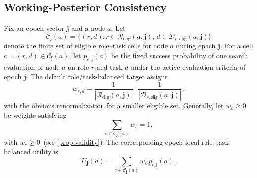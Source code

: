 \subsection{Working-Posterior Consistency}
\label{app:proofs:role_task_balance}
Fix an epoch vector \(\boldsymbol{j}\) and a node \(a\). Let
\[
\mathcal C_{\boldsymbol{j}}(a)
=
\{(r,d): r\in \mathcal{R}_{\mathrm{elig}}(a,\boldsymbol{j}),\ d\in \mathcal{D}_{r,\mathrm{elig}}(a,\boldsymbol{j})\}
\]
denote the finite set of eligible role--task cells for node \(a\) during epoch \(\boldsymbol{j}\).
For a cell \(c=(r,d)\in \mathcal C_{\boldsymbol{j}}(a)\), let \(p_{c,\boldsymbol{j}}(a)\) be the fixed success
probability of one search evaluation of node \(a\) on role \(r\) and task \(d\)
under the active evaluation criteria of epoch \(\boldsymbol{j}\). The default role/task-balanced target assigns
\[
w_{r,d}
=
\frac{1}{|\mathcal{R}_{\mathrm{elig}}(a,\boldsymbol{j})|}\cdot
\frac{1}{|\mathcal{D}_{r,\mathrm{elig}}(a,\boldsymbol{j})|},
\]
with the obvious renormalization for a smaller eligible set. Generally,
let \(w_c\ge 0\) be weights satisfying
\[
\sum_{c\in \mathcal C_{\boldsymbol{j}}(a)} w_c = 1,
\]
with \(w_c\ge 0\)~(see \cref{prop:validity}).
The corresponding epoch-local role--task balanced utility is
\[
U_{\boldsymbol{j}}(a)
=
\sum_{c\in \mathcal C_{\boldsymbol{j}}(a)} w_c\,p_{c,\boldsymbol{j}}(a).
\]

